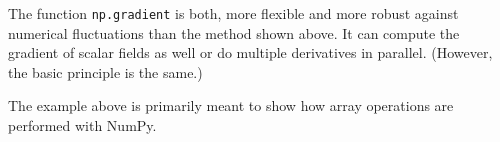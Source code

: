 
\begin{frame}[fragile]
%
\begin{hintbox}[np.gradient]
The function \texttt{np.gradient} is both, more flexible and more robust against numerical fluctuations than the method shown above. It can compute the gradient of scalar fields as well or do multiple derivatives in parallel. (However, the basic principle is the same.)

\vspace{3pt}
The example above is primarily meant to show how array operations are performed with NumPy.
\end{hintbox}
%
\end{frame}


